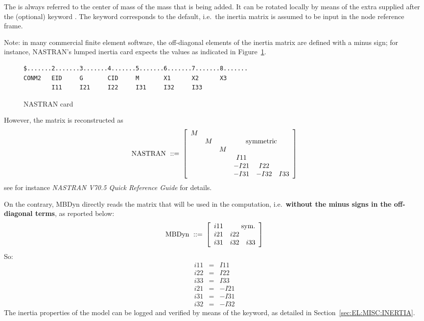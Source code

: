 The  is always referred to the center of mass of the
mass that is being added. It can be rotated locally by means of the extra
 supplied after the (optional) keyword .
The keyword  corresponds to the default, i.e.\ the inertia matrix
is assumed to be input in the node reference frame.

Note: in many commercial finite element software, the off-diagonal elements 
of the inertia matrix are defined with a minus sign; for instance, 
NASTRAN's  lumped inertia card expects the values as indicated
in Figure~\ref{fig:el:body:CONM2}.
%
\begin{figure}
\centering
\begin{minipage}{120mm}
\begin{verbatim}
$.......2.......3.......4.......5.......6.......7.......8.......
CONM2   EID     G       CID     M       X1      X2      X3
        I11     I21     I22     I31     I32     I33
\end{verbatim}
\end{minipage}
\caption{NASTRAN  card}
\label{fig:el:body:CONM2}
\end{figure}
%
However, the matrix is reconstructed as
\begin{displaymath}
	\mathrm{NASTRAN \ ::= } \ \sqbr{\matr{cccccc}{
		M & & & & & \\
		& M & & \multicolumn{3}{c}{\mathrm{symmetric}} \\
		& & M & & & \\
		& & & I11 & & \\
		& & & -I21 & I22 & \\
		& & & -I31 & -I32 & I33
	}}
\end{displaymath}
see for instance \emph{NASTRAN V70.5 Quick Reference Guide} for details.

\noindent
On the contrary, MBDyn directly reads the matrix 
that will be used in the computation, i.e.\ 
\textbf{without the minus signs in the off-diagonal terms},
as reported below:
\begin{displaymath}
	\mathrm{MBDyn \ ::= } \ \sqbr{\matr{ccc}{
		i11 & \multicolumn{2}{r}{\mathrm{sym.}} \\
		i21 & i22 & \\
		i31 & i32 & i33
	}}
\end{displaymath}
So:
\begin{eqnarray*}
	i11 & = & I11 \\
	i22 & = & I22 \\
	i33 & = & I33 \\
	i21 & = & - I21 \\
	i31 & = & - I31 \\
	i32 & = & - I32
\end{eqnarray*}
The inertia properties of the model can be logged and verified
by means of the  keyword, as detailed
in Section~\ref{sec:EL:MISC:INERTIA}.

